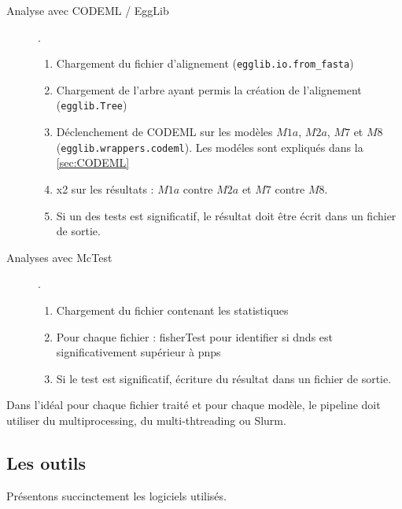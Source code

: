 \documentclass[../main]{subfiles} %
\begin{document}
\begin{description}
    \item [Analyse avec \gls{CODEML} / \gls{EggLib}].  
    \begin{enumerate}
        \item Chargement du fichier d'alignement (\lstinline{egglib.io.from_fasta})
        \item Chargement de l'arbre ayant permis la création de l'alignement (\lstinline{egglib.Tree})
        \item Déclenchement de \gls{CODEML} sur les modèles $M1a$, $M2a$, $M7$ et $M8$  (\lstinline{egglib.wrappers.codeml}). Les modéles sont expliqués dans la  \cref{sec:CODEML}
        \item \Gls{x2} sur les résultats : $M1a$ contre $M2a$ et $M7$ contre $M8$.
        \item Si un des tests est significatif, le résultat doit être écrit dans un fichier de sortie.
    \end{enumerate}
    
    \item [Analyses avec \gls{McTest}].
        \begin{enumerate}
        \item Chargement du fichier contenant les statistiques 
        \item Pour chaque fichier : \gls{fisherTest} pour identifier si \acrshort{dnds} est significativement supérieur à \acrshort{pnps}
        \item Si le test est significatif, écriture du résultat dans un fichier de sortie.
    \end{enumerate}
\end{description}

Dans l'idéal pour chaque fichier traité et pour chaque modèle, le pipeline doit utiliser du multiprocessing, du multi-thtreading ou \gls{Slurm}.

\subsection{Les outils}

Présentons succinctement les logiciels utilisés.
\end{document}

